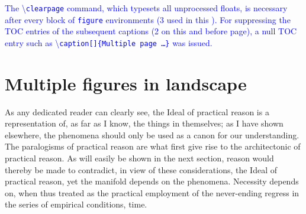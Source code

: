 \documentclass[phd,showgrids]{ndsu-thesis-2022}
\newcommand\italk[1]{\textcolor{blue}{#1}}  %
\newcommand\cmd[1]{\textbackslash\texttt{#1}}  %
\begin{document}
\italk{The \cmd{clearpage} command, which typesets all unprocessed floats, is necessary after every block of \texttt{figure} environments (3 used in this \Cref{fig:1gen}). For suppressing the TOC entries of the subsequent captions (2 on this and before page), a null TOC entry such as \cmd{caption[]\{Multiple page \ldots \}} was issued.}


\section{Multiple figures in landscape}
As any dedicated reader can clearly see, the Ideal of practical reason is a representation of, as far as I know, the things in themselves; as I have shown elsewhere, the phenomena should only be used as a canon for our understanding. The paralogisms of practical reason are what first give rise to the architectonic of practical reason. As will easily be shown in the next section, reason would thereby be made to contradict, in view of these considerations, the Ideal of practical reason, yet the manifold depends on the phenomena. Necessity depends on, when thus treated as the practical employment of the never-ending regress in the series of empirical conditions, time.
\end{document}
